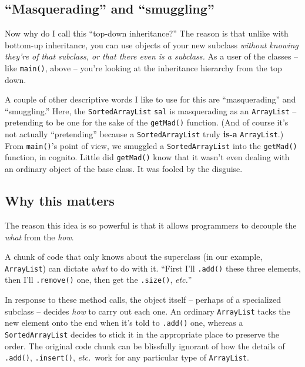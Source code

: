 \subsection{``Masquerading'' and ``smuggling''}

Now why do I call this ``top-down inheritance?'' The reason is that unlike with
bottom-up inheritance, you can use objects of your new subclass
\textit{without knowing they're of that subclass, or that there even is a
subclass.} As a user of the classes -- like \texttt{main()}, above -- you're
looking at the inheritance hierarchy from the top down.


A couple of other descriptive words I like to use for this are ``masquerading''
and ``smuggling.'' Here, the \texttt{SortedArrayList} \texttt{sal} is
masquerading as an \texttt{ArrayList} -- pretending to be one for the sake of
the \texttt{getMad()} function. (And of course it's not actually ``pretending''
because a \texttt{SortedArrayList} truly \mbox{\textbf{is-a}}
\texttt{ArrayList}.) From \texttt{main()}'s point of view, we smuggled a
\texttt{SortedArrayList} into the \texttt{getMad()} function, in cognito.
Little did \texttt{getMad()} know that it wasn't even dealing with an ordinary
object of the base class. It was fooled by the disguise.

\subsection{Why this matters}

The reason this idea is so powerful is that it allows programmers to decouple
the \textit{what} from the \textit{how}.

A chunk of code that only knows about the superclass (in our example,
\texttt{ArrayList}) can dictate \textit{what} to do with it. ``First I'll
\texttt{.add()} these three elements, then I'll \texttt{.remove()} one, then
get the \texttt{.size()}, \textit{etc.}''

In response to these method calls, the object itself -- perhaps of a
specialized subclass -- decides \textit{how} to carry out each one. An
ordinary \texttt{ArrayList} tacks the new element onto the end when it's told
to \texttt{.add()} one, whereas a \texttt{SortedArrayList} decides to stick it
in the appropriate place to preserve the order. The original code chunk can be
blissfully ignorant of how the details of \texttt{.add()}, \texttt{.insert()},
\textit{etc.}~work for any particular type of \texttt{ArrayList}.

